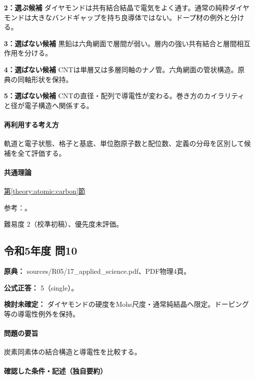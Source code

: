 \noindent\textbf{2：選ぶ候補} ダイヤモンドは共有結合結晶で電気をよく通す。通常の純粋ダイヤモンドは大きなバンドギャップを持ち良導体ではない。ドープ材の例外と分ける。\par

\noindent\textbf{3：選ばない候補} 黒鉛は六角網面で層間が弱い。層内の強い共有結合と層間相互作用を分ける。\par

\noindent\textbf{4：選ばない候補} CNTは単層又は多層同軸のナノ管。六角網面の管状構造。原典の同軸形状を保持。\par

\noindent\textbf{5：選ばない候補} CNTの直径・配列で導電性が変わる。巻き方のカイラリティと径が電子構造へ関係する。\par

\paragraph{再利用する考え方} 軌道と電子状態、格子と基底、単位胞原子数と配位数、定義の分母を区別して候補を全て評価する。

\paragraph{共通理論} \hyperref[theory:atomic:carbon]{第\ref*{theory:atomic:carbon}節}

\par 参考：\cite{atomic_cnt,atomic_diamond}。

\par 難易度 2（校準初稿）、優先度未評価。

\subsection{令和5年度 問10}
\label{q:r05-reg-applied-10}

\noindent\textbf{原典：} sources/R05/17\_applied\_science.pdf、PDF物理4頁。

\textbf{公式正答：} 5（single）。

\par\textbf{検討未確定：} ダイヤモンドの硬度をMohs尺度・通常純結晶へ限定。ドーピング等の導電性例外を保持。

\paragraph{問題の要旨} 炭素同素体の結合構造と導電性を比較する。

\paragraph{確認した条件・記述（独自要約）}\mbox{}\par

